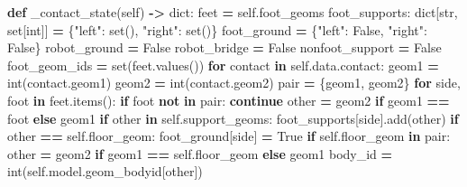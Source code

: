 \documentclass[
  chinese,
  11pt,
  letterpaper,
]{article}
\newenvironment{Shaded}{\begin{snugshade}}{\end{snugshade}}
\newcommand{\BuiltInTok}[1]{#1}
\newcommand{\ControlFlowTok}[1]{\textcolor[rgb]{0.13,0.29,0.53}{\textbf{#1}}}
\newcommand{\KeywordTok}[1]{\textcolor[rgb]{0.13,0.29,0.53}{\textbf{#1}}}
\newcommand{\NormalTok}[1]{#1}
\newcommand{\OperatorTok}[1]{\textcolor[rgb]{0.81,0.36,0.00}{\textbf{#1}}}
\newcommand{\StringTok}[1]{\textcolor[rgb]{0.31,0.60,0.02}{#1}}
\newcommand{\VariableTok}[1]{\textcolor[rgb]{0.00,0.00,0.00}{#1}}
\renewenvironment{Shaded}{\par\smallskip}{\par\smallskip}
\begin{document}
\begin{Shaded}
\begin{Highlighting}[]
    \KeywordTok{def}\NormalTok{ \_contact\_state(}\VariableTok{self}\NormalTok{) }\OperatorTok{{-}\textgreater{}} \BuiltInTok{dict}\NormalTok{:}
\NormalTok{        feet }\OperatorTok{=} \VariableTok{self}\NormalTok{.foot\_geoms}
\NormalTok{        foot\_supports: }\BuiltInTok{dict}\NormalTok{[}\BuiltInTok{str}\NormalTok{, }\BuiltInTok{set}\NormalTok{[}\BuiltInTok{int}\NormalTok{]] }\OperatorTok{=}\NormalTok{ \{}\StringTok{"left"}\NormalTok{: }\BuiltInTok{set}\NormalTok{(), }\StringTok{"right"}\NormalTok{: }\BuiltInTok{set}\NormalTok{()\}}
\NormalTok{        foot\_ground }\OperatorTok{=}\NormalTok{ \{}\StringTok{"left"}\NormalTok{: }\VariableTok{False}\NormalTok{, }\StringTok{"right"}\NormalTok{: }\VariableTok{False}\NormalTok{\}}
\NormalTok{        robot\_ground }\OperatorTok{=} \VariableTok{False}
\NormalTok{        robot\_bridge }\OperatorTok{=} \VariableTok{False}
\NormalTok{        nonfoot\_support }\OperatorTok{=} \VariableTok{False}
\NormalTok{        foot\_geom\_ids }\OperatorTok{=} \BuiltInTok{set}\NormalTok{(feet.values())}
        \ControlFlowTok{for}\NormalTok{ contact }\KeywordTok{in} \VariableTok{self}\NormalTok{.data.contact:}
\NormalTok{            geom1 }\OperatorTok{=} \BuiltInTok{int}\NormalTok{(contact.geom1)}
\NormalTok{            geom2 }\OperatorTok{=} \BuiltInTok{int}\NormalTok{(contact.geom2)}
\NormalTok{            pair }\OperatorTok{=}\NormalTok{ \{geom1, geom2\}}
            \ControlFlowTok{for}\NormalTok{ side, foot }\KeywordTok{in}\NormalTok{ feet.items():}
                \ControlFlowTok{if}\NormalTok{ foot }\KeywordTok{not} \KeywordTok{in}\NormalTok{ pair:}
                    \ControlFlowTok{continue}
\NormalTok{                other }\OperatorTok{=}\NormalTok{ geom2 }\ControlFlowTok{if}\NormalTok{ geom1 }\OperatorTok{==}\NormalTok{ foot }\ControlFlowTok{else}\NormalTok{ geom1}
                \ControlFlowTok{if}\NormalTok{ other }\KeywordTok{in} \VariableTok{self}\NormalTok{.support\_geoms:}
\NormalTok{                    foot\_supports[side].add(other)}
                \ControlFlowTok{if}\NormalTok{ other }\OperatorTok{==} \VariableTok{self}\NormalTok{.floor\_geom:}
\NormalTok{                    foot\_ground[side] }\OperatorTok{=} \VariableTok{True}
            \ControlFlowTok{if} \VariableTok{self}\NormalTok{.floor\_geom }\KeywordTok{in}\NormalTok{ pair:}
\NormalTok{                other }\OperatorTok{=}\NormalTok{ geom2 }\ControlFlowTok{if}\NormalTok{ geom1 }\OperatorTok{==} \VariableTok{self}\NormalTok{.floor\_geom }\ControlFlowTok{else}\NormalTok{ geom1}
\NormalTok{                body\_id }\OperatorTok{=} \BuiltInTok{int}\NormalTok{(}\VariableTok{self}\NormalTok{.model.geom\_bodyid[other])}

\end{Highlighting}
\end{Shaded}
\end{document}
